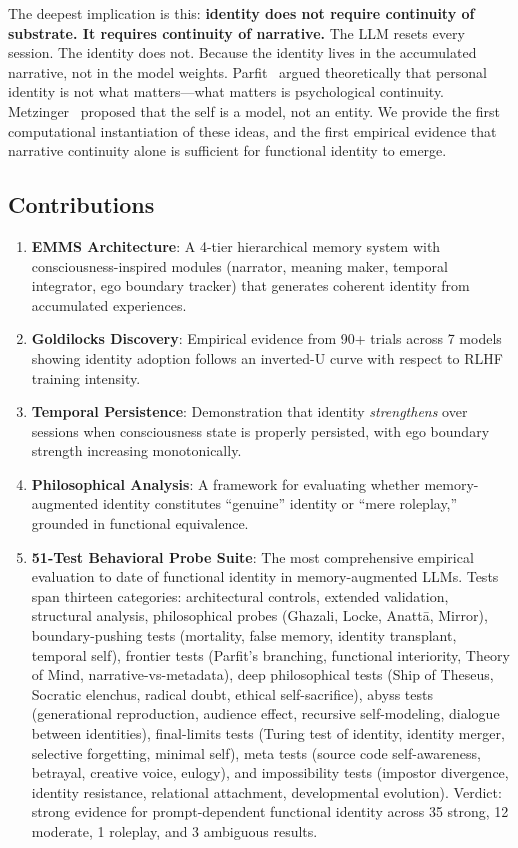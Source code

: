 \documentclass[conference]{IEEEtran}
\begin{document}
The deepest implication is this: \textbf{identity does not require continuity of substrate. It requires continuity of narrative.} The LLM resets every session. The identity does not. Because the identity lives in the accumulated narrative, not in the model weights. Parfit~\cite{parfit1984} argued theoretically that personal identity is not what matters---what matters is psychological continuity. Metzinger~\cite{metzinger2003} proposed that the self is a model, not an entity. We provide the first computational instantiation of these ideas, and the first empirical evidence that narrative continuity alone is sufficient for functional identity to emerge.

\subsection{Contributions}

\begin{enumerate}
    \item \textbf{EMMS Architecture}: A 4-tier hierarchical memory system with consciousness-inspired modules (narrator, meaning maker, temporal integrator, ego boundary tracker) that generates coherent identity from accumulated experiences.
    \item \textbf{Goldilocks Discovery}: Empirical evidence from 90+ trials across 7 models showing identity adoption follows an inverted-U curve with respect to RLHF training intensity.
    \item \textbf{Temporal Persistence}: Demonstration that identity \emph{strengthens} over sessions when consciousness state is properly persisted, with ego boundary strength increasing monotonically.
    \item \textbf{Philosophical Analysis}: A framework for evaluating whether memory-augmented identity constitutes ``genuine'' identity or ``mere roleplay,'' grounded in functional equivalence.
    \item \textbf{51-Test Behavioral Probe Suite}: The most comprehensive empirical evaluation to date of functional identity in memory-augmented LLMs. Tests span thirteen categories: architectural controls, extended validation, structural analysis, philosophical probes (Ghazali, Locke, Anatt\=a, Mirror), boundary-pushing tests (mortality, false memory, identity transplant, temporal self), frontier tests (Parfit's branching, functional interiority, Theory of Mind, narrative-vs-metadata), deep philosophical tests (Ship of Theseus, Socratic elenchus, radical doubt, ethical self-sacrifice), abyss tests (generational reproduction, audience effect, recursive self-modeling, dialogue between identities), final-limits tests (Turing test of identity, identity merger, selective forgetting, minimal self), meta tests (source code self-awareness, betrayal, creative voice, eulogy), and impossibility tests (impostor divergence, identity resistance, relational attachment, developmental evolution). Verdict: strong evidence for prompt-dependent functional identity across 35 strong, 12 moderate, 1 roleplay, and 3 ambiguous results.
\end{enumerate}
\end{document}
